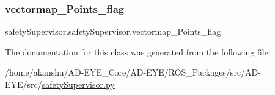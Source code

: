 \mbox{\label{classsafetySupervisor_1_1safetySupervisor_ab1a015515abff5d8d5eaa2d0254b1570}} 
\subsubsection{\texorpdfstring{vectormap\+\_\+\+Points\+\_\+flag}{vectormap\_Points\_flag}}
{\footnotesize\ttfamily safety\+Supervisor.\+safety\+Supervisor.\+vectormap\+\_\+\+Points\+\_\+flag}



The documentation for this class was generated from the following file\+:\begin{DoxyCompactItemize}
\item 
/home/akanshu/\+A\+D-\/\+E\+Y\+E\+\_\+\+Core/\+A\+D-\/\+E\+Y\+E/\+R\+O\+S\+\_\+\+Packages/src/\+A\+D-\/\+E\+Y\+E/src/\hyperlink{safetySupervisor_8py}{safety\+Supervisor.\+py}\end{DoxyCompactItemize}
